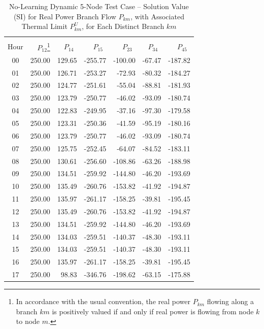 \documentclass[12pt]{article}
\begin{document}
\begin{table}[h]
	\caption{No-Learning Dynamic 5-Node Test Case -- Solution Value (SI) for Real Power Branch Flow $P_{km}$, with Associated Thermal Limit $P_{km}^U$, for Each Distinct Branch $km$} 
	\label{tab: 5Node.NoLearning.BranchFlows}
\begin{minipage}{\textwidth}
	\centering
\begin{tabular}{crrrrrr} 
\hline\hline
\\[0.1ex]

Hour & $P_{12}$\footnote{In accordance with the usual convention, the real power $P_{km}$ flowing along a branch $km$ is positively valued if and only if real power is flowing from node $k$ to node $m$.}  & $P_{14}~~$ & $P_{15}~~$ & $P_{23}~~$ & $P_{34}~~$ & $P_{45}~~$ \\
\hline
00	&	250.00	&	129.65	&	-255.77	&	-100.00	&	-67.47	&	-187.82	\\
01  & 250.00	&	126.71	&	-253.27	&	-72.93	&	-80.32	&	-184.27	\\
02	&	250.00	&	124.77	&	-251.61	&	-55.04	&	-88.81	&	-181.93	\\
03	&	250.00	&	123.79	&	-250.77	&	-46.02	&	-93.09	&	-180.74	\\
04	&	250.00	&	122.83	&	-249.95	&	-37.16	&	-97.30	&	-179.58	\\
05	&	250.00	&	123.31	&	-250.36	&	-41.59	&	-95.19	&	-180.16	\\
06	&	250.00	&	123.79	&	-250.77	&	-46.02	&	-93.09	&	-180.74	\\
07	&	250.00	&	125.75	&	-252.45	&	-64.07	&	-84.52	&	-183.11	\\
08	&	250.00	&	130.61	&	-256.60	&	-108.86	&	-63.26	&	-188.98	\\
09	&	250.00	&	134.51	&	-259.92	&	-144.80	&	-46.20	&	-193.69	\\
10	&	250.00	&	135.49	&	-260.76	&	-153.82	&	-41.92	&	-194.87	\\
11	&	250.00	&	135.97	&	-261.17	&	-158.25	&	-39.81	&	-195.45	\\
12	&	250.00	&	135.49	&	-260.76	&	-153.82	&	-41.92	&	-194.87	\\
13	&	250.00	&	134.51	&	-259.92	&	-144.80	&	-46.20	&	-193.69	\\
14	&	250.00	&	134.03	&	-259.51	&	-140.37	&	-48.30	&	-193.11	\\
15	&	250.00	&	134.03	&	-259.51	&	-140.37	&	-48.30	&	-193.11	\\
16	&	250.00	&	135.97	&	-261.17	&	-158.25	&	-39.81	&	-195.45	\\
17	&	250.00	&	 98.83	&	-346.76	&	-198.62	&	-63.15	&	-175.88	\\

\end{tabular}
\end{minipage}
\end{table}
\end{document}
